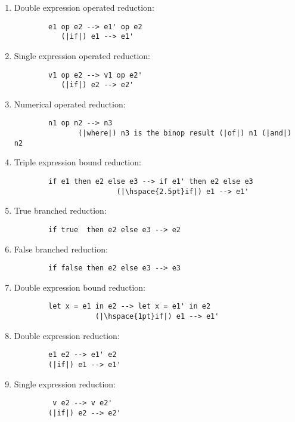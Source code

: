 \begin{itemize}
\begin{enumerate}
        \item Double expression operated reduction:
        \begin{lstlisting}
        e1 op e2 --> e1' op e2
           (|if|) e1 --> e1'
        \end{lstlisting}
        \item Single expression operated reduction:
        \begin{lstlisting}
        v1 op e2 --> v1 op e2'
           (|if|) e2 --> e2'
        \end{lstlisting}
        \item Numerical operated reduction:
        \begin{lstlisting}
        n1 op n2 --> n3
               (|where|) n3 is the binop result (|of|) n1 (|and|) n2
        \end{lstlisting}
        \item Triple expression bound reduction:
        \begin{lstlisting}
        if e1 then e2 else e3 --> if e1' then e2 else e3
                        (|\hspace{2.5pt}if|) e1 --> e1'
        \end{lstlisting}
        \item True branched reduction:
        \begin{lstlisting}
        if true  then e2 else e3 --> e2
        \end{lstlisting}
        \item False branched reduction:
        \begin{lstlisting}
        if false then e2 else e3 --> e3
        \end{lstlisting}
        \item Double expression bound reduction:
        \begin{lstlisting}
        let x = e1 in e2 --> let x = e1' in e2
                   (|\hspace{1pt}if|) e1 --> e1'
        \end{lstlisting}
        \item Double expression reduction:
        \begin{lstlisting}
        e1 e2 --> e1' e2
        (|if|) e1 --> e1'
        \end{lstlisting}
        \item Single expression reduction:
        \begin{lstlisting}
         v e2 --> v e2'
        (|if|) e2 --> e2'
        \end{lstlisting}

\end{enumerate}
\end{itemize}
